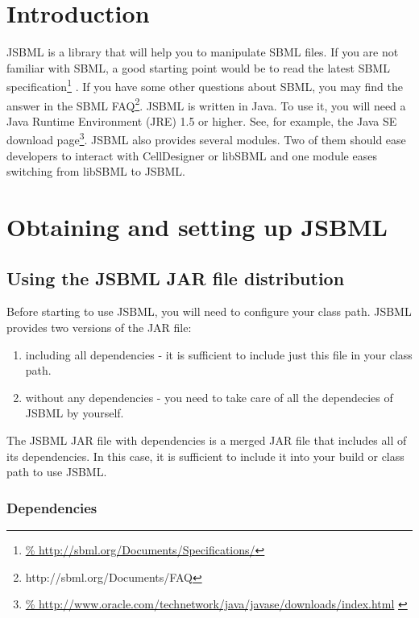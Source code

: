 \section{Introduction}

JSBML is a library that will help you to manipulate SBML files. If you are not
familiar with SBML, a good starting point would be to read the latest SBML
specification\footnote{\url{%
http://sbml.org/Documents/Specifications/}} \citep{Hucka2010a}. If you have some
other questions about SBML, you may find the answer in the SBML
FAQ\footnote{http://sbml.org/Documents/FAQ}. JSBML is written in Java\TTra. To
use it, you will need a Java Runtime Environment (JRE) 1.5 or higher. See, for
example, the Java SE download page\footnote{\url{%
http://www.oracle.com/technetwork/java/javase/downloads/index.html}
\label{fn:jvmldl}}.
JSBML also provides several modules. Two of them should ease developers to
interact with CellDesigner or libSBML and one module eases switching from
libSBML to JSBML.


\section{Obtaining and setting up JSBML}

\subsection{Using the JSBML JAR file distribution}
Before starting to use JSBML, you will need to configure your class path. JSBML
provides two versions of the JAR file:
\begin{enumerate}
\item including all dependencies - it is sufficient to include just this file in
      your class path.
\item without any dependencies - you need to take care of all the dependecies of
      JSBML by yourself.
\end{enumerate}

The JSBML JAR file with dependencies is a merged JAR file that includes all of
its dependencies. In this case, it is sufficient to include
it into your build or class path to use JSBML.



\subsubsection{Dependencies}
%

